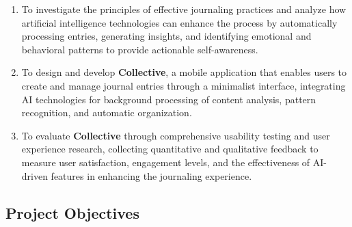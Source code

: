\begin{enumerate}
	\item To investigate the principles of effective journaling practices and analyze how artificial intelligence technologies can enhance the process by automatically processing entries, generating insights, and identifying emotional and behavioral patterns to provide actionable self-awareness.
	
	\item To design and develop \textbf{Collective}, a mobile application that enables users to create and manage journal entries through a minimalist interface, integrating AI technologies for background processing of content analysis, pattern recognition, and automatic organization.
	
	\item To evaluate \textbf{Collective} through comprehensive usability testing and user experience research, collecting quantitative and qualitative feedback to measure user satisfaction, engagement levels, and the effectiveness of AI-driven features in enhancing the journaling experience.
\end{enumerate}

\subsection{Project Objectives}\label{subsec:project-objectives}

